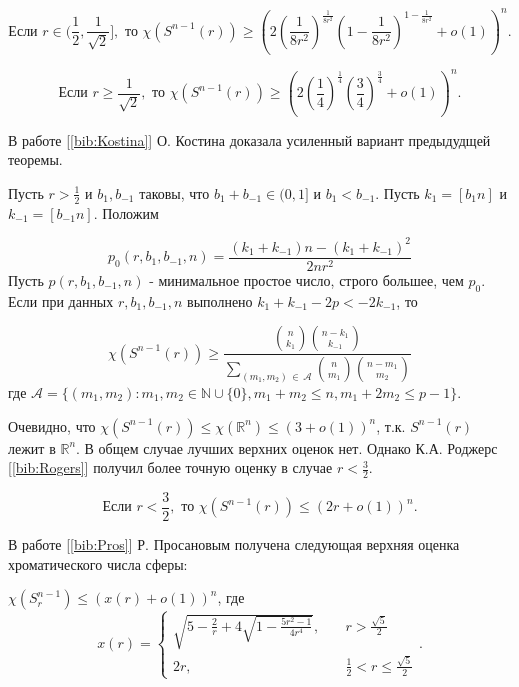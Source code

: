 \begin{theorem1}

$$\text{Если } r \in (\frac{1}{2}, \frac{1}{\sqrt{2}}], \text{ то } 
\chi(S^{n-1}(r)) \geq \left(2(\frac{1}{8r^2})^{\frac{1}{8r^2}}(1-\frac{1}{8r^2})^{1-\frac{1}{8r^2}}+o(1)\right)^n.$$ 

$$\text{Если } r \geq \frac{1}{\sqrt{2}}, \text{ то } 
\chi(S^{n-1}(r)) \geq \left(2(\frac{1}{4})^{\frac{1}{4}}(\frac{3}{4})^{\frac{3}{4}}+o(1)\right)^n.$$

\end{theorem1}
В работе [\ref{bib:Kostina}] О. Костина доказала усиленный вариант предыдудщей теоремы.

\begin{theorem1}
Пусть $r > \tfrac{1}{2}$ и $b_1, b_{-1}$ таковы, что $b_1 + b_{-1} \in (0,1]$ и $b_1 < b_{-1}$.
Пусть $k_1=[b_1n]$ и $k_{-1}=[b_{-1}n]$. Положим

$$p_0(r,b_1,b_{-1},n) = \frac{(k_1 + k_{-1})n - (k_1 + k_{-1})^2}{2nr^2}$$
Пусть $p(r,b_1,b_{-1},n)$ - минимальное простое число, строго большее, чем $p_0$. 
Если при данных $r,b_1,b_{-1},n$ выполнено $k_1 + k_{-1} - 2p < -2k_{-1}$, то

$$\chi(S^{n-1}(r)) \geq 
\frac{\binom{n}{k_1}\binom{n-k_1}{k_{-1}}}
{\sum\limits_{(m_1,m_2) \, \in \, \mathcal{A}} \binom{n}{m_1} \binom{n-m_1}{m_2}}$$
где $\mathcal{A} = \{ (m_1,m_2): m_1,m_2 \in \mathbb{N} \cup \{ 0 \}, m_1+m_2 \leq n, m_1+2m_2 \leq p-1 \}$.

\end{theorem1}

Очевидно, что $\chi(S^{n-1}(r)) \leq \chi(\mathbb{R}^n) \leq (3+o(1))^n$, т.к. $S^{n-1}(r)$ лежит в $\mathbb{R}^n$. В общем случае лучших верхних оценок нет. Однако К.А. Роджерс [\ref{bib:Rogers}] получил более точную оценку в случае $r < \frac{3}{2}$.

\begin{theorem1}
$$\text{Если } r < \frac{3}{2}, \text{ то } \chi(S^{n-1}(r)) \leq (2r+o(1))^n.$$
\end{theorem1}

В работе [\ref{bib:Pros}] Р. Просановым получена следующая верхняя оценка хроматического числа сферы:

\begin{theorem1}
$\chi(S_r^{n-1}) \leq (x(r)+o(1))^n$, где
$$ x(r) = 
\begin{cases}
\sqrt{5-\frac{2}{r}+4\sqrt{1-\frac{5r^2-1}{4r^4}}},& \quad r > \frac{\sqrt{5}}{2} \\ 
2r,& \quad \frac{1}{2} < r \leq  \frac{\sqrt{5}}{2}
\end{cases}.$$
\end{theorem1}

